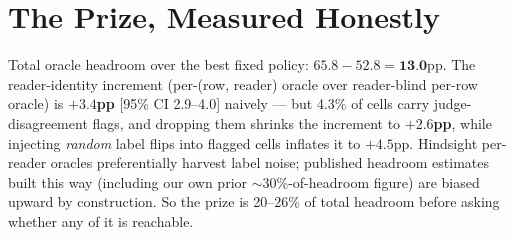 \section{The Prize, Measured Honestly}
\label{sec:prize}

Total oracle headroom over the best fixed policy: $65.8 - 52.8 =
\textbf{13.0}$pp. The reader-identity increment (per-(row, reader) oracle over
reader-blind per-row oracle) is \textbf{$+3.4$pp} [95\% CI 2.9--4.0] naively ---
but 4.3\% of cells carry judge-disagreement flags, and dropping them shrinks the
increment to \textbf{$+2.6$pp}, while injecting \emph{random} label flips into
flagged cells inflates it to $+4.5$pp. Hindsight per-reader oracles
preferentially harvest label noise; published headroom estimates built this way
(including our own prior $\sim$30\%-of-headroom figure) are biased upward by
construction. So the prize is 20--26\% of total headroom before asking whether
any of it is reachable.

